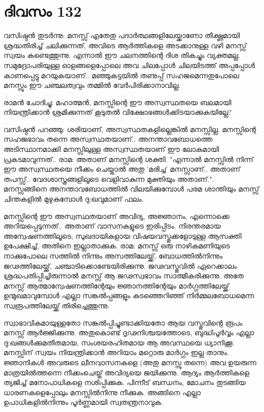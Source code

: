  
\section{ദിവസം 132}


വസിഷ്ഠന്‍ തുടര്‍ന്നു: മനസ്സ്‌ എതേതു പദാര്‍ത്ഥങ്ങളിലേയ്ക്കാണോ തീക്ഷ്ണമായി ശ്രദ്ധതിരിച്ച് ചലിക്കുന്നത്‌, അവിടെ ആര്‍ത്തികളെ അടക്കാനുള്ള വഴി മനസ്സ്‌ സ്വയം കണ്ടെത്തുന്നു. എന്നാല്‍  ഈ ചലനത്തിന്റെ ദിശ തികച്ചും വ്യക്തമല്ല. സമുദ്രോപരിയുള്ള ഓളങ്ങളെപ്പോലെ അവ ചിലപ്പോള്‍ ചിലയിടത്ത്‌ അപ്പപ്പോള്‍ കാണപ്പെട്ടു മറയുകയാണ്‌.. മഞ്ഞുകട്ടയില്‍ തണുപ്പ്‌ സഹജമെന്നതുപോലെ മനസ്സും ഈ ചഞ്ചലത്വവും  തമ്മില്‍ വേര്‍പിരിക്കാനാവില്ല.

രാമന്‍ ചോദിച്ചു: മഹാത്മന്‍, മനസ്സിന്റെ ഈ അസ്വസ്ഥതയെ ബലമായി നിയന്ത്രിക്കാന്‍ ശ്രമിക്കുന്നത്‌ കൂടുതല്‍ വിക്ഷോഭങ്ങള്‍ക്കിടയാക്കുകയില്ലേ?

വസിഷ്ഠന്‍ പറഞ്ഞു: ശരിയാണ്‌, അസ്വസ്ഥതകളില്ലെങ്കില്‍ മനസ്സില്ല. മനസ്സിന്റെ സഹജഭാവം തന്നെ അസ്വസ്ഥതയാണ്‌.. അനന്താവബോധത്തെ അടിസ്ഥാനമാക്കി മനസ്സിലുള്ള അസ്വസ്ഥതയാണ്‌ ഈ ലോകമായി പ്രകടമാവുന്നത്‌.. രാമ: അതാണ്‌ മനസ്സിന്റെ ശക്തി. "എന്നാല്‍ മനസ്സില്‍ നിന്ന് ഈ അസ്വസ്ഥതയെ നീക്കം ചെയ്താല്‍ അതു 'മരിച്ച' മനസ്സാണ്‌.. അതാണ്‌ തപസ്സ്‌.. വേദശാസ്ത്രങ്ങളിലൂടെ വെളിവാകുന്ന മുക്തിയും അതാണ്‌.". മനസ്സങ്ങിനെ അനന്താവബോധത്തില്‍ വിലയിക്കുമ്പോള്‍ പരമ ശാന്തിയും മനസ്സ്‌ ചിന്തകളില്‍ മുഴുകുമ്പോള്‍ ദു:ഖവുമാണ്‌ ഫലം.

മനസ്സിന്റെ ഈ അസ്വസ്ഥതയാണ്‌ അവിദ്യ, അജ്ഞാനം, എന്നൊക്കെ അറിയപ്പെടുന്നത്‌.. അതാണ്‌ വാസനകളുടെ ഇരിപ്പിടം. നിരന്തരമായ അന്വേഷണത്തിലൂടെ, സുഖദായികളായ വിഷയവസ്തുക്കളോടുള്ള ആസക്തി ഉപേക്ഷിച്ച്‌, അതിനെ ഇല്ലാതാക്കുക. രാമ: മനസ്സ്‌ ഒരു നാഴികമണിയുടെ നാക്കുപോലെ സത്തില്‍ നിന്നും അസത്തിലേയ്ക്ക്‌, ബോധത്തില്‍നിന്നും ജഢത്തിലേയ്ക്ക്‌, ചഞ്ചാടിക്കൊണ്ടേയിരിക്കുന്നു. ജഢവസ്തുവില്‍ ഏറെക്കാലം ശ്രദ്ധപതിപ്പിച്ചിരുന്നാല്‍ മനസ്സ്‌ ആ ജഢസ്വഭാവം സാത്മീകരിക്കുന്നു. അതേ മനസ്സ്‌ ആത്മാന്വേഷണത്തിന്റേയും ജ്ഞാനത്തിന്റേയും മാര്‍ഗ്ഗത്തിലേയ്ക്ക്‌ ഉന്മുഖമാവുമ്പോള്‍ എല്ലാ സങ്കല്‍പ്പങ്ങളും കുടഞ്ഞെറിഞ്ഞ്‌ നിര്‍മ്മലബോധമെന്ന സ്വരൂപത്തിലേയ്ക്ക്‌ തിരിച്ചെത്തുന്നു.

സ്വാഭാവികമായുള്ളതോ സങ്കല്‍പ്പിച്ചുണ്ടാക്കിയതോ ആയ വസ്തുവിന്റെ രൂപം മനസ്സ്‌ ആര്‍ജ്ജിക്കുന്നു. അതുകൊണ്ട്‌ ദൃഢനിശ്ചയത്തോടെ, ബുദ്ധിപൂര്‍വ്വം എല്ലാ ദു:ഖങ്ങള്‍ക്കുമതീതമായ, സംശയരഹിതമായ ആ അവസ്ഥയെ ധ്യാനിക്കൂ. മനസ്സിന്‌ സ്വയം നിയന്ത്രിക്കാന്‍ അറിയാം മറ്റൊരു മാര്‍ഗ്ഗം ഇല്ല താനും. ജ്ഞാനികള്‍ അവരുടെ ലീനവാസനകളെ (അതു മനസ്സു തന്നെ) അവ ഉയരുന്ന മാത്രയില്‍ത്തന്നെ നീക്കംചെയ്ത്‌ അവിദ്യയെ ജയിക്കുന്നു. ആദ്യം ആര്‍ത്തികളെ ത്യജിച്ച്‌ മനോപാധികളെ നശിപ്പിക്കുക. പിന്നീട്‌ ബന്ധനം, മോചനം തുടങ്ങിയ ധാരണകളെപ്പോലും മനസ്സില്‍നിന്നു നീക്കുക. അങ്ങിനെ എല്ലാ ഉപാധികളില്‍നിന്നും പൂര്‍ണ്ണമായി സ്വതന്ത്രനാവുക. 

